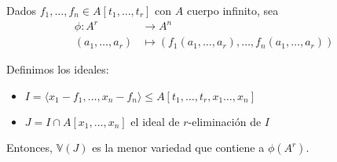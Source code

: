 \begin{teorema}
    Dados $f_1,\dots, f_n \in A[t_1, \dots, t_r]$ con $A$ cuerpo infinito, sea
    \begin{align*}
        \phi \colon A^r  & \to A^n\\
        (a_1,\dots, a_r) & \mapsto \left( f_1(a_1,\dots, a_r), \dots, f_n(a_1,\dots, a_r) \right)
    \end{align*}

    Definimos los ideales:
    \begin{itemize}
        \item $I = \langle x_1-f_1,\dots,  x_n-f_n\rangle \le A[t_1,\dots, t_r,x_1\dots, x_n]$
        \item $J = I\cap A[x_1,\dots, x_n]$ el ideal de $r$-eliminación de $I$
    \end{itemize}

    Entonces, $\mathbb{V}(J)$ es la menor variedad que contiene a $\phi(A^r)$.
\end{teorema}
